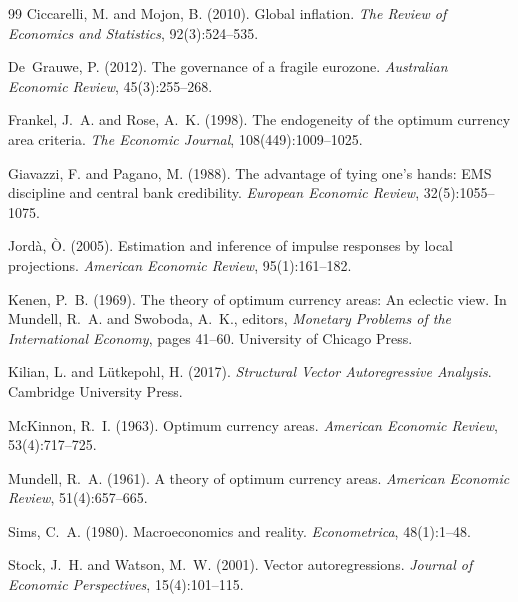 \documentclass[11pt,a4paper]{article}
\begin{document}
\begin{thebibliography}{99}
Ciccarelli, M. and Mojon, B. (2010).
\newblock Global inflation.
\newblock \emph{The Review of Economics and Statistics}, 92(3):524--535.

De~Grauwe, P. (2012).
\newblock The governance of a fragile eurozone.
\newblock \emph{Australian Economic Review}, 45(3):255--268.

Frankel, J.~A. and Rose, A.~K. (1998).
\newblock The endogeneity of the optimum currency area criteria.
\newblock \emph{The Economic Journal}, 108(449):1009--1025.

Giavazzi, F. and Pagano, M. (1988).
\newblock The advantage of tying one's hands: EMS discipline and central bank
  credibility.
\newblock \emph{European Economic Review}, 32(5):1055--1075.

Jord\`{a}, \`{O}. (2005).
\newblock Estimation and inference of impulse responses by local projections.
\newblock \emph{American Economic Review}, 95(1):161--182.

Kenen, P.~B. (1969).
\newblock The theory of optimum currency areas: An eclectic view.
\newblock In Mundell, R.~A. and Swoboda, A.~K., editors, \emph{Monetary
  Problems of the International Economy}, pages 41--60. University of Chicago
  Press.

Kilian, L. and L\"{u}tkepohl, H. (2017).
\newblock \emph{Structural Vector Autoregressive Analysis}.
\newblock Cambridge University Press.

McKinnon, R.~I. (1963).
\newblock Optimum currency areas.
\newblock \emph{American Economic Review}, 53(4):717--725.

Mundell, R.~A. (1961).
\newblock A theory of optimum currency areas.
\newblock \emph{American Economic Review}, 51(4):657--665.

Sims, C.~A. (1980).
\newblock Macroeconomics and reality.
\newblock \emph{Econometrica}, 48(1):1--48.

Stock, J.~H. and Watson, M.~W. (2001).
\newblock Vector autoregressions.
\newblock \emph{Journal of Economic Perspectives}, 15(4):101--115.

\end{thebibliography}
\endgroup
\end{document}
